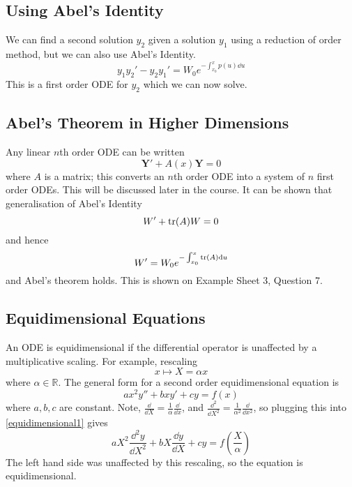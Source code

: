 \documentclass{article}
\begin{document}
\subsection{Using Abel's Identity}
We can find a second solution $y_2$ given a solution $y_1$ using a reduction of order method, but we can also use Abel's Identity.
\[ y_1y_2' - y_2y_1' = W_0 e^{-\int_{x_0}^x p(u) \dd u} \]
This is a first order ODE for $y_2$ which we can now solve.

\subsection{Abel's Theorem in Higher Dimensions}
Any linear $n$th order ODE can be written
\[\bm Y' + A(x) \bm Y = 0 \]
where $A$ is a matrix; this converts an $n$th order ODE into a system of $n$ first order ODEs. This will be discussed later in the course. It can be shown that generalisation of Abel's Identity
\[ W' + \tr(A)W = 0 \]
and hence
\[ W' = W_0e^{-\int_{x_0}^x \tr(A) \dd u} \]
and Abel's theorem holds. This is shown on Example Sheet 3, Question 7.

\subsection{Equidimensional Equations}
An ODE is equidimensional if the differential operator is unaffected by a multiplicative scaling. For example, rescaling
\[ x \mapsto X = \alpha x \]
where $\alpha \in \mathbb R$. The general form for a second order equidimensional equation is
\begin{equation}\label{equidimensional1}
	ax^2 y'' + bxy' + cy = f(x)
\end{equation}
where $a, b, c$ are constant. Note, $\frac{\dd}{\dd X} = \frac{1}{\alpha}\frac{\dd}{\dd x}$, and $\frac{\dd^2}{\dd X^2} = \frac{1}{\alpha^2}\frac{\dd}{\dd x^2}$, so plugging this into \eqref{equidimensional1} gives
\[ aX^2\frac{\dd^2 y}{\dd X^2} + bX\frac{\dd y}{\dd X} + cy = f\left(\frac{X}{\alpha}\right) \]
The left hand side was unaffected by this rescaling, so the equation is equidimensional.
\end{document}
